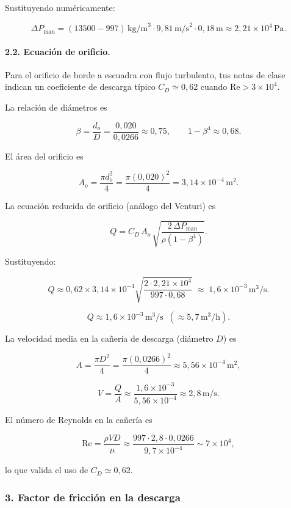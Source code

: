 \documentclass[12pt, a4paper]{article}
\begin{document}
Sustituyendo numéricamente:

\[
\Delta P_{\text{man}}
= (13500 - 997)\,\text{kg/m}^3 \cdot 9{,}81\,\text{m/s}^2 \cdot 0{,}18\,\text{m}
\approx 2{,}21\times 10^4\,\text{Pa}.
\]

\paragraph{2.2. Ecuación de orificio.}

Para el orificio de borde a escuadra con flujo turbulento, tus notas de clase
indican un coeficiente de descarga típico $C_D \simeq 0{,}62$ cuando
$\text{Re}>3\times 10^4$.

La relación de diámetros es

\[
\beta = \frac{d_o}{D} = \frac{0{,}020}{0{,}0266} \approx 0{,}75,
\qquad
1-\beta^4 \approx 0{,}68.
\]

El área del orificio es

\[
A_o = \frac{\pi d_o^2}{4}
    = \frac{\pi (0{,}020)^2}{4}
    = 3{,}14\times 10^{-4}\,\text{m}^2.
\]

La ecuación reducida de orificio (análogo del Venturi) es

\[
Q = C_D\,A_o\,
    \sqrt{\frac{2\,\Delta P_{\text{man}}}{\rho (1-\beta^4)}}.
\]

Sustituyendo:

\[
Q \approx 0{,}62 \times 3{,}14\times 10^{-4}
    \sqrt{\frac{2\cdot 2{,}21\times 10^4}{997\cdot 0{,}68}}
   \;\approx\; 1{,}6\times 10^{-3}\,\text{m}^3/\text{s}.
\]

\[
\boxed{Q \approx 1{,}6\times 10^{-3}\,\text{m}^3/\text{s}
      \;\; (\approx 5{,}7\,\text{m}^3/\text{h}).}
\]

La velocidad media en la cañería de descarga (diámetro $D$) es

\[
A = \frac{\pi D^2}{4}
  = \frac{\pi (0{,}0266)^2}{4}
  \approx 5{,}56\times 10^{-4}\,\text{m}^2,
\]

\[
V = \frac{Q}{A}
  \approx \frac{1{,}6\times 10^{-3}}{5{,}56\times 10^{-4}}
  \approx 2{,}8\,\text{m/s}.
\]

El número de Reynolds en la cañería es

\[
\text{Re} = \frac{\rho V D}{\mu}
          \approx \frac{997 \cdot 2{,}8 \cdot 0{,}0266}{9{,}7\times 10^{-4}}
          \sim 7\times 10^4,
\]

lo que valida el uso de $C_D\simeq 0{,}62$.

\subsubsection*{3. Factor de fricción en la descarga}
\end{document}

